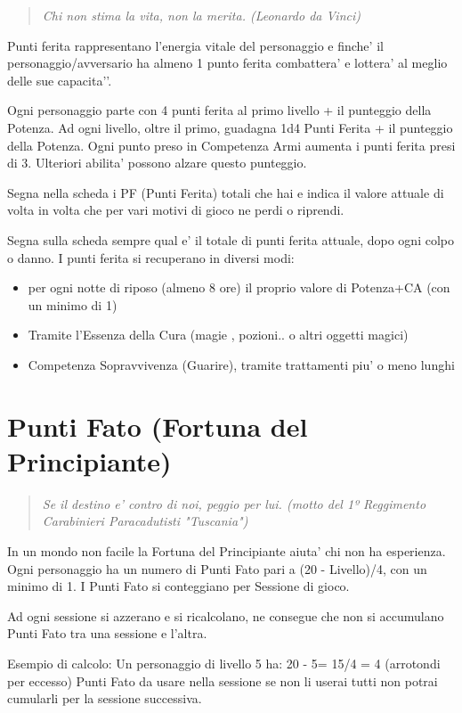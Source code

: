 \documentclass[a4paper,11pt,twoside,openany]{book}
\begin{document}
\begin{quote}\textit{Chi non stima la vita, non la merita. (Leonardo da Vinci)
}\end{quote}


Punti ferita rappresentano l’energia vitale del personaggio e finche’ il personaggio/avversario ha almeno 1 punto ferita combattera’ e lottera’ al meglio delle sue capacita'’.

Ogni personaggio parte con 4 punti ferita al primo livello + il punteggio della Potenza.
Ad ogni livello, oltre il primo, guadagna 1d4 Punti Ferita + il punteggio della Potenza. 
Ogni punto preso in Competenza Armi aumenta i punti ferita presi di 3. Ulteriori abilita’ possono alzare questo punteggio.

Segna nella scheda i PF (Punti Ferita) totali che hai e indica il valore attuale di volta in volta che per vari motivi di gioco ne perdi o riprendi.

Segna sulla scheda sempre qual e’ il totale di punti ferita attuale, dopo ogni colpo o danno.
I punti ferita si recuperano in diversi modi:

\begin{itemize}
\item 
per ogni notte di riposo (almeno 8 ore) il proprio valore di Potenza+CA (con un minimo di 1) 
\item
 Tramite l'Essenza della Cura (magie , pozioni.. o altri oggetti magici) 
\item 
Competenza Sopravvivenza (Guarire), tramite trattamenti piu' o meno lunghi 
\end{itemize}


\section{Punti Fato (Fortuna del Principiante)}
\begin{quote}\textit{Se il destino e' contro di noi, peggio per lui. (motto del 1º Reggimento Carabinieri Paracadutisti "Tuscania")
}\end{quote}

In un mondo non facile la Fortuna del Principiante aiuta’ chi non ha esperienza.
Ogni personaggio ha un numero di Punti Fato pari a (20 - Livello)/4, con un minimo di 1. I Punti Fato si conteggiano per Sessione di gioco. 

Ad ogni sessione si azzerano e si ricalcolano, ne consegue che non si accumulano Punti Fato tra una sessione e l’altra.

Esempio di calcolo:
Un personaggio di livello 5 ha: 20 - 5= 15/4 = 4 (arrotondi per eccesso) Punti Fato da usare nella sessione se non li userai tutti non potrai cumularli per la sessione successiva.
\end{document}
